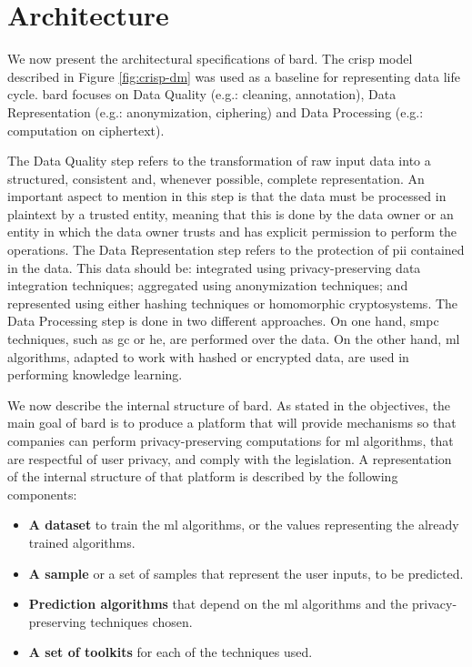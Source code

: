 
\section{Architecture}
\label{sec:Architecture}


We now present the architectural specifications of \ac{bard}. The \ac{crisp} model described in Figure \ref{fig:crisp-dm} was used as a baseline for representing data life cycle. \ac{bard} focuses on Data Quality (e.g.: cleaning, annotation), Data Representation (e.g.: anonymization, ciphering) and Data Processing (e.g.: computation on ciphertext).

The Data Quality step refers to the transformation of raw input data into a structured, consistent and, whenever possible, complete representation. An important aspect to mention in this step is that the data must be processed in plaintext by a trusted entity, meaning that this is done by the data owner or an entity in which the data owner trusts and has explicit permission to perform the operations.
The Data Representation step refers to the protection of \ac{pii} contained in the data. This data should be: integrated using privacy-preserving data integration techniques; aggregated using anonymization techniques; and represented using either hashing techniques or homomorphic cryptosystems.
The Data Processing step is done in two different approaches. On one hand, \ac{smpc} techniques, such as \ac{gc} or \ac{he}, are performed over the data. On the other hand, \ac{ml} algorithms, adapted to work with hashed or encrypted data, are used in performing knowledge learning.

We now describe the internal structure of \ac{bard}.
As stated in the objectives, the main goal of \ac{bard} is to produce a platform that will provide mechanisms so that companies can perform privacy-preserving computations for \ac{ml} algorithms, that are respectful of user privacy, and comply with the legislation. A representation of the internal structure of that platform is described by the following components: 
\begin{itemize}
	\item \textbf{A dataset} to train the \ac{ml} algorithms, or the values representing the already trained algorithms.
	\item \textbf{A sample} or a set of samples that represent the user inputs, to be predicted.
	\item \textbf{Prediction algorithms} that depend on the \ac{ml} algorithms and the privacy-preserving techniques chosen.
	\item \textbf{A set of toolkits} for each of the techniques used.
\end{itemize}

